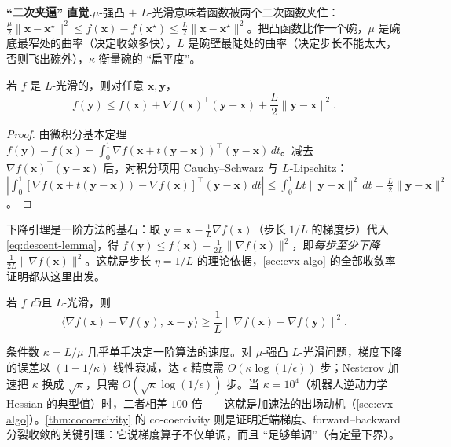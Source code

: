\noindent\textbf{“二次夹逼” 直觉.}\;$\mu$-强凸 $+$ $L$-光滑意味着函数被两个二次函数夹住：$\tfrac\mu2\|\mathbf x-\mathbf x^\star\|^2\le f(\mathbf x)-f(\mathbf x^\star)\le\tfrac L2\|\mathbf x-\mathbf x^\star\|^2$。把凸函数比作一个碗，$\mu$ 是碗底最窄处的曲率（决定收敛多快），$L$ 是碗壁最陡处的曲率（决定步长不能太大，否则飞出碗外），$\kappa$ 衡量碗的 “扁平度”。

\begin{theorem}\label{thm:descent-lemma}
若 $f$ 是 $L$-光滑的，则对任意 $\mathbf x,\mathbf y$，
\begin{equation}
  f(\mathbf y)\le f(\mathbf x)+\nabla f(\mathbf x)^\top(\mathbf y-\mathbf x)+\frac L2\|\mathbf y-\mathbf x\|^2.
  \label{eq:descent-lemma}
\end{equation}
\end{theorem}
\begin{proof}
由微积分基本定理 $f(\mathbf y)-f(\mathbf x)=\int_0^1\nabla f(\mathbf x+t(\mathbf y-\mathbf x))^\top(\mathbf y-\mathbf x)\,dt$。减去 $\nabla f(\mathbf x)^\top(\mathbf y-\mathbf x)$ 后，对积分项用 Cauchy--Schwarz 与 $L$-Lipschitz：$|\!\int_0^1[\nabla f(\mathbf x+t(\mathbf y-\mathbf x))-\nabla f(\mathbf x)]^\top(\mathbf y-\mathbf x)\,dt|\le\int_0^1 Lt\|\mathbf y-\mathbf x\|^2\,dt=\tfrac L2\|\mathbf y-\mathbf x\|^2$。
\end{proof}

下降引理是一阶方法的基石：取 $\mathbf y=\mathbf x-\tfrac1L\nabla f(\mathbf x)$（步长 $1/L$ 的梯度步）代入 \cref{eq:descent-lemma}，得 $f(\mathbf y)\le f(\mathbf x)-\tfrac1{2L}\|\nabla f(\mathbf x)\|^2$，即\emph{每步至少下降 $\tfrac1{2L}\|\nabla f(\mathbf x)\|^2$}。这就是步长 $\eta=1/L$ 的理论依据，\cref{sec:cvx-algo} 的全部收敛率证明都从这里出发。

\begin{theorem}\label{thm:cocoercivity}
若 $f$ \emph{凸}且 $L$-光滑，则
\begin{equation}
  \langle\nabla f(\mathbf x)-\nabla f(\mathbf y),\ \mathbf x-\mathbf y\rangle\ge\frac1L\|\nabla f(\mathbf x)-\nabla f(\mathbf y)\|^2.
  \label{eq:cocoercivity}
\end{equation}
\end{theorem}

\begin{insight}[条件数决定一阶算法的迭代数]\label{ins:condition-number}
条件数 $\kappa=L/\mu$ 几乎单手决定一阶算法的速度。对 $\mu$-强凸 $L$-光滑问题，梯度下降的误差以 $(1-1/\kappa)$ 线性衰减，达 $\epsilon$ 精度需 $O(\kappa\log(1/\epsilon))$ 步；Nesterov 加速把 $\kappa$ 换成 $\sqrt\kappa$，只需 $O(\sqrt\kappa\log(1/\epsilon))$ 步。当 $\kappa=10^4$（机器人逆动力学 Hessian 的典型值）时，二者相差 $100$ 倍——这就是加速法的出场动机（\cref{sec:cvx-algo}）。\cref{thm:cocoercivity} 的 co-coercivity 则是证明近端梯度、forward--backward 分裂收敛的关键引理：它说梯度算子不仅单调，而且 “足够单调”（有定量下界）。
\end{insight}

